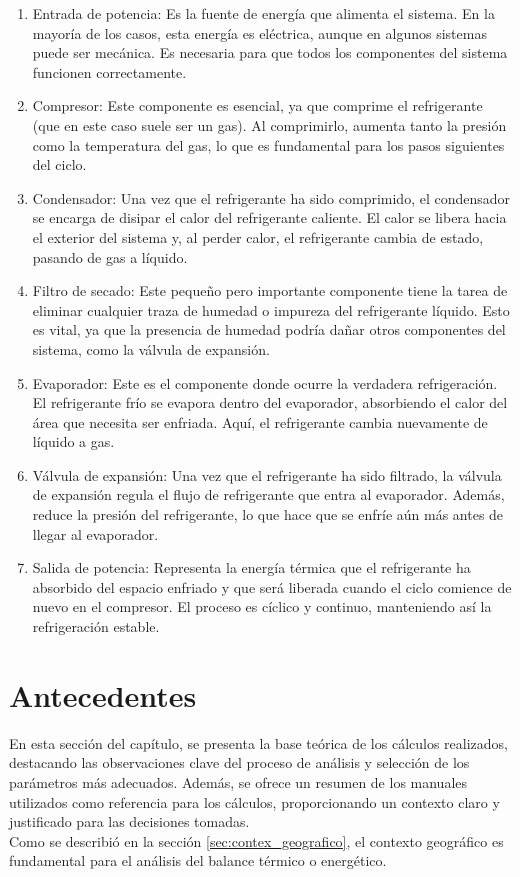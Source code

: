   \begin{enumerate}
 \item Entrada de potencia: Es la fuente de energía que alimenta el sistema. En la mayoría de los casos, esta energía es eléctrica, aunque en algunos sistemas puede ser mecánica. Es necesaria para que todos los componentes del sistema funcionen correctamente.
  
 \item Compresor: Este componente es esencial, ya que comprime el refrigerante (que en este caso suele ser un gas). Al comprimirlo, aumenta tanto la presión como la temperatura del gas, lo que es fundamental para los pasos siguientes del ciclo.
  
  \item Condensador: Una vez que el refrigerante ha sido comprimido, el condensador se encarga de disipar el calor del refrigerante caliente. El calor se libera hacia el exterior del sistema y, al perder calor, el refrigerante cambia de estado, pasando de gas a líquido.
  
 \item  Filtro de secado: Este pequeño pero importante componente tiene la tarea de eliminar cualquier traza de humedad o impureza del refrigerante líquido. Esto es vital, ya que la presencia de humedad podría dañar otros componentes del sistema, como la válvula de expansión.
   \item  Evaporador: Este es el componente donde ocurre la verdadera refrigeración. El refrigerante frío se evapora dentro del evaporador, absorbiendo el calor del área que necesita ser enfriada. Aquí, el refrigerante cambia nuevamente de líquido a gas.  
 \item  Válvula de expansión: Una vez que el refrigerante ha sido filtrado, la válvula de expansión regula el flujo de refrigerante que entra al evaporador. Además, reduce la presión del refrigerante, lo que hace que se enfríe aún más antes de llegar al evaporador.
  \item  Salida de potencia: Representa la energía térmica que el refrigerante ha absorbido del espacio enfriado y que será liberada cuando el ciclo comience de nuevo en el compresor. El proceso es cíclico y continuo, manteniendo así la refrigeración estable.
 
  \end{enumerate}
  
  
\section{Antecedentes}
                                                                                                                             En esta sección del capítulo, se presenta la base teórica de los cálculos realizados, destacando las observaciones clave del proceso de análisis y selección de los parámetros más adecuados. Además, se ofrece un resumen de los manuales utilizados como referencia para los cálculos, proporcionando un contexto claro y justificado para las decisiones tomadas.\\
Como se describió en la sección \ref{sec:contex_geografico}, el contexto geográfico es fundamental para el análisis del balance térmico o energético.
